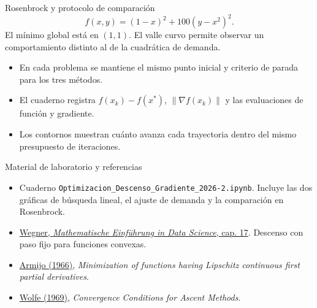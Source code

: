 \documentclass[aspectratio=169,12pt]{beamer}
\newcommand{\norm}[1]{\left\lVert#1\right\rVert}
\newcommand{\wegner}{\href{https://doi.org/10.1007/978-3-662-68697-3}{Wegner, \emph{Mathematische Einführung in Data Science}, cap. 17}}
\begin{document}
\begin{frame}{Rosenbrock y protocolo de comparación}
\[
 f(x,y)=(1-x)^2+100(y-x^2)^2.
\]
El mínimo global está en $(1,1)$. El valle curvo permite observar un
comportamiento distinto al de la cuadrática de demanda.
\begin{itemize}
\item En cada problema se mantiene el mismo punto inicial y criterio
de parada para los tres métodos.
\item El cuaderno registra $f(x_k)-f(x^*)$, $\norm{\nabla f(x_k)}$ y las
evaluaciones de función y gradiente.
\item Los contornos muestran cuánto avanza cada trayectoria dentro del
mismo presupuesto de iteraciones.
\end{itemize}
\end{frame}

\begin{frame}{Material de laboratorio y referencias}
\begin{itemize}
\item Cuaderno \texttt{Optimizacion\_Descenso\_Gradiente\_2026-2.ipynb}.
  Incluye las dos gráficas de búsqueda lineal, el ajuste de demanda y
  la comparación en Rosenbrock.
\item \wegner. Descenso con paso fijo para funciones convexas.
\item \href{https://doi.org/10.2140/pjm.1966.16.1}{Armijo (1966)},
  \emph{Minimization of functions having Lipschitz continuous first partial derivatives}.
\item \href{https://doi.org/10.1137/1011036}{Wolfe (1969)},
  \emph{Convergence Conditions for Ascent Methods}.
\end{itemize}
\end{frame}
\end{document}
